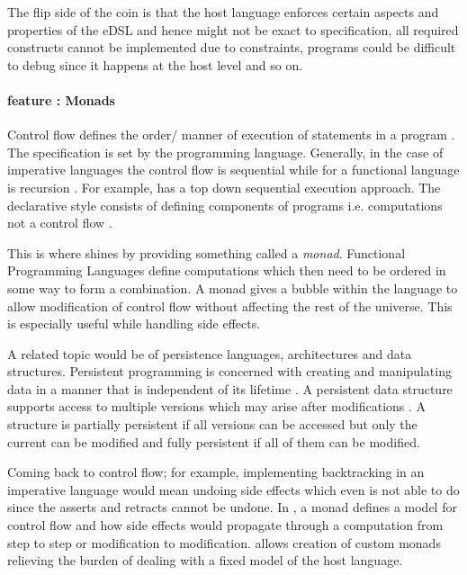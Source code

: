 \documentclass[thesis-solanki.tex]{subfiles}
\begin{document}
  The flip side of the coin is that the host language enforces certain aspects and properties of the eDSL and hence
  might not be exact to specification, all required constructs cannot be implemented due to constraints, programs
  could be difficult to debug since it happens at the host level and so on.

\paragraph{ feature : Monads}
Control flow defines the order/ manner of execution of statements in a pro\-gram \cite{website:controlflowwiki}.
The specification is set by the programming language.
Generally, in the case of imperative languages the control flow is sequential while for a functional language is
recursion \cite{website:controlflowdalhousie}.
For example,  has a top down sequential execution approach.
The declarative style consists of defining components of programs i.e.
computations not a control flow \cite{website:declarativeprogrammingwiki}.

This is where  shines by providing something called a \textit{monad}.
Functional Programming Languages
define computations which then need to be ordered in some way to form a
combination\cite{website:monadascomputation}.
A monad gives a bubble within the language to allow modification of control flow without affecting the rest of the
universe.
This is especially useful while handling side effects.

A related topic would be of persistence languages, architectures and data structures.
Persistent programming is concerned with creating and manipulating data in a manner that is independent of its
lifetime \cite{morrison1990persistent}.
A persistent data structure supports access to multiple versions which may arise after modifications
\cite{driscoll1986making, website:persistentdatastructuresmit}.
A structure is partially persistent if all versions can be accessed but only the current can be modified and fully
persistent if all of them can be modified.

Coming back to control flow; for example, implementing backtracking in an imperative language would mean undoing
side effects which even  is not able to do since the asserts and retracts cannot be undone.
In , a monad defines a model for control flow and how side effects would propagate through a
computation from step to step or modification to modification.
 allows creation of custom monads relieving the burden of dealing with a fixed model of the
host language.
\end{document}
